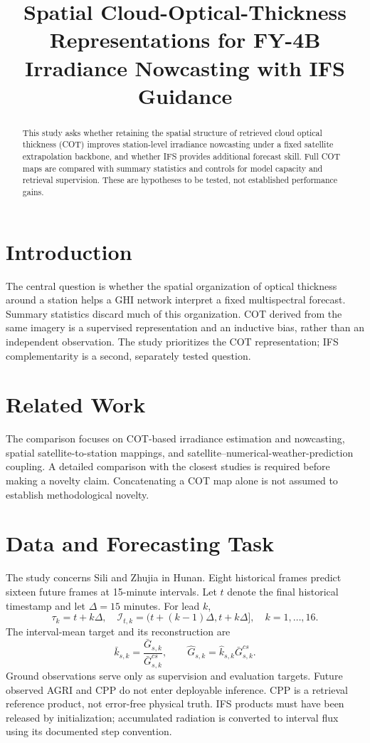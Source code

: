 \documentclass[11pt]{article}
\title{Spatial Cloud-Optical-Thickness Representations for FY-4B Irradiance Nowcasting with IFS Guidance}
\author{}
\date{}
\begin{document}
\maketitle
\begin{abstract}
This study asks whether retaining the spatial structure of retrieved cloud optical thickness (COT) improves station-level irradiance nowcasting under a fixed satellite extrapolation backbone, and whether IFS provides additional forecast skill. Full COT maps are compared with summary statistics and controls for model capacity and retrieval supervision. These are hypotheses to be tested, not established performance gains.
\end{abstract}
\section{Introduction}
The central question is whether the spatial organization of optical thickness around a station helps a GHI network interpret a fixed multispectral forecast. Summary statistics discard much of this organization. COT derived from the same imagery is a supervised representation and an inductive bias, rather than an independent observation. The study prioritizes the COT representation; IFS complementarity is a second, separately tested question.
\section{Related Work}
The comparison focuses on COT-based irradiance estimation and nowcasting, spatial satellite-to-station mappings, and satellite--numerical-weather-prediction coupling. A detailed comparison with the closest studies is required before making a novelty claim. Concatenating a COT map alone is not assumed to establish methodological novelty.
\section{Data and Forecasting Task}
The study concerns Sili and Zhujia in Hunan. Eight historical frames predict sixteen future frames at 15-minute intervals. Let $t$ denote the final historical timestamp and let $\Delta=15$ minutes. For lead $k$,
\begin{equation}
\tau_k=t+k\Delta,\quad \mathcal I_{t,k}=(t+(k-1)\Delta,t+k\Delta],\quad k=1,\ldots,16.
\end{equation}
The interval-mean target and its reconstruction are
\begin{equation}
\bar k_{s,k}=\frac{\bar G_{s,k}}{\bar G^{cs}_{s,k}},\qquad
\widehat G_{s,k}=\widehat k_{s,k}\bar G^{cs}_{s,k}.
\end{equation}
Ground observations serve only as supervision and evaluation targets. Future observed AGRI and CPP do not enter deployable inference. CPP is a retrieval reference product, not error-free physical truth. IFS products must have been released by initialization; accumulated radiation is converted to interval flux using its documented step convention.
\end{document}
